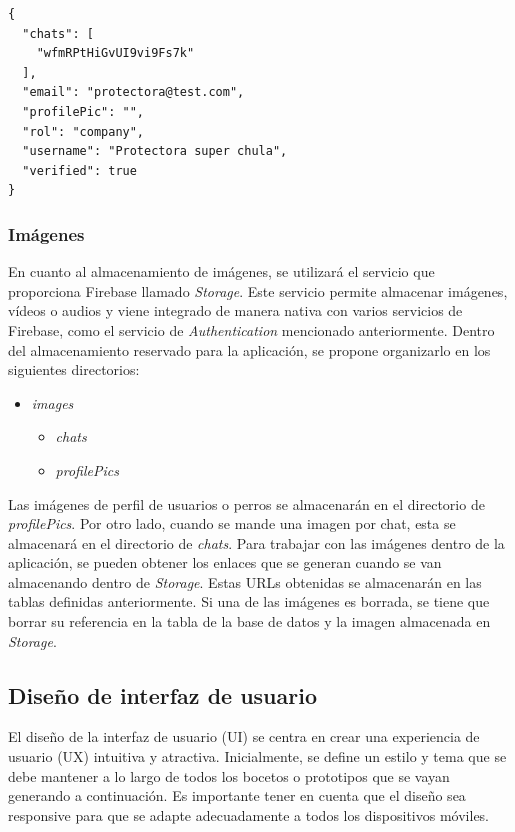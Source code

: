 \documentclass[a4paper, 12pt]{article}
\begin{document}
\begin{verbatim}
{
  "chats": [
    "wfmRPtHiGvUI9vi9Fs7k"
  ],
  "email": "protectora@test.com",
  "profilePic": "",
  "rol": "company",
  "username": "Protectora super chula",
  "verified": true
}
\end{verbatim}

\subsubsection{Imágenes}

En cuanto al almacenamiento de imágenes, se utilizará el servicio que proporciona Firebase llamado \textit{Storage}. Este servicio permite almacenar imágenes, vídeos o audios y viene integrado de manera nativa con varios servicios de Firebase, como el servicio de \textit{Authentication} mencionado anteriormente. Dentro del almacenamiento reservado para la aplicación, se propone organizarlo en los siguientes directorios:

\begin{itemize}[noitemsep]
	\item \textit{images}
	\begin{itemize}[noitemsep]
		\item \textit{chats}
		\item \textit{profilePics}
	\end{itemize}
\end{itemize}

Las imágenes de perfil de usuarios o perros se almacenarán en el directorio de \textit{profilePics}. Por otro lado, cuando se mande una imagen por chat, esta se almacenará en el directorio de \textit{chats}. Para trabajar con las imágenes dentro de la aplicación, se pueden obtener los enlaces que se generan cuando se van almacenando dentro de \textit{Storage}. Estas URLs obtenidas se almacenarán en las tablas definidas anteriormente. Si una de las imágenes es borrada, se tiene que borrar su referencia en la tabla de la base de datos y la imagen almacenada en \textit{Storage}.

\subsection{Diseño de interfaz de usuario}

El diseño de la interfaz de usuario (UI) se centra en crear una experiencia de usuario (UX) intuitiva y atractiva. Inicialmente, se define un estilo y tema que se debe mantener a lo largo de todos los bocetos o prototipos que se vayan generando a continuación. Es importante tener en cuenta que el diseño sea responsive para que se adapte adecuadamente a todos los dispositivos móviles.
\end{document}
